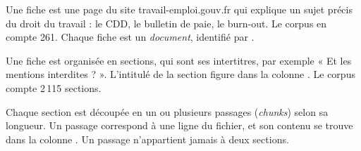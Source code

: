 \begin{description}[leftmargin=0pt, itemsep=3pt, font=\sffamily\bfseries\color{accent}]
\item[Fiche.] Une fiche est une page du site travail-emploi.gouv.fr qui explique un sujet précis du
droit du travail : le CDD, le bulletin de paie, le burn-out. Le corpus en compte 261. Chaque fiche est un
\emph{document}, identifié par .
\item[Section.] Une fiche est organisée en sections, qui sont ses intertitres, par exemple « Et les
mentions interdites ? ». L'intitulé de la section figure dans la colonne . Le corpus compte
2\,115 sections.
\item[Passage.] Chaque section est découpée en un ou plusieurs passages (\emph{chunks}) selon sa
longueur. Un passage correspond à une ligne du fichier, et son contenu se trouve dans la colonne
. Un passage n'appartient jamais à deux sections.
\end{description}

